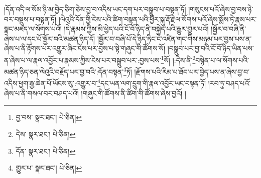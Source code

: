 །དོན་འདི་ལ་སོམ་ཉི་མ་བྱེད་ཅིག་ཅེས་བྱ་བ་འདིས་ཡང་དག་པར་བསྒྲུབ་པ་བསྟན་ཏོ། །གསུངས་པའོ་ཞེས་བྱ་བས་ཉེ་བར་བསྡུས་པ་བསྟན་ཏོ། །ལེའུའི་དོན་གྱི་ངེས་པའི་ཚིག་བསྟན་པའི་ཕྱིར་སྐུ་རྡོ་རྗེ་ལ་སོགས་པའོ་ཞེས་སྨོས་ཏེ་རྣམ་པར་སྣང་མཛད་ལ་སོགས་པའོ། །དེ་རྣམས་ཀྱིས་མི་ཕྱེད་པའི་ངོ་བོ་ཉིད་ནི་བསྐྱེད་པའི་རྒྱུར་གྱུར་པའོ། །སྦྱོར་བ་བཞི་ནི་ཞེས་པ་ལ་དང་པོ་སྦྱོར་བའི་མཚན་ཉིད་དོ། །སྦྱོར་བ་བཞི་པོ་དེ་ཉིད་ཏིང་ངེ་འཛིན་གང་གིས་མཉམ་པར་བྱས་པས་ན་ཞེས་པ་ནི་རྟོགས་པར་འགྱུར་ཞིང་ངེས་པར་བྱས་པ་སྟེ་གཞུང་གི་ཚོགས་སོ། །བསྒྲུབ་པར་བྱ་བའི་ངོ་བོ་ཉིད་ཡིན་པས་ན་ཞེས་པ་ལ་རྣལ་འབྱོར་པ་རྣམས་ཀྱིས་ངེས་པར་བསྒྲུབ་པར་:བྱས་པས་\footnote{བྱ་བས་  སྣར་ཐང་།  པེ་ཅིན། }སོ། །:དེས་ནི་\footnote{དེས་  སྣར་ཐང་།  པེ་ཅིན། }བསྙེན་པ་ལ་སོགས་པའི་མཚན་ཉིད་ཅན་ལེའུའི་བརྗོད་པར་བྱ་བའི་:དོན་བསྟན་\footnote{དོན་  སྣར་ཐང་།  པེ་ཅིན། }ཏོ། །རྫོགས་པའི་རིམ་པ་ཐོབ་པར་བྱེད་པས་ན་ཞེས་བྱ་བ་འདིས་ཕྱག་རྒྱ་ཆེན་པོ་ཡོངས་སུ་:འགྱུར་བ་\footnote{གྱུར་པ་  སྣར་ཐང་།  པེ་ཅིན། }དང་ཡན་ལག་དྲུག་གི་རྣལ་འབྱོར་ཡང་བསྟན་ཏོ། །རབ་ཏུ་བཤད་པའོ་ཞེས་པ་ནི་གསལ་བར་བཤད་པའོ། །གཞུང་གི་ཚོགས་ནི་ཚིག་གི་ཚོགས་ཞེས་བྱའོ། །
